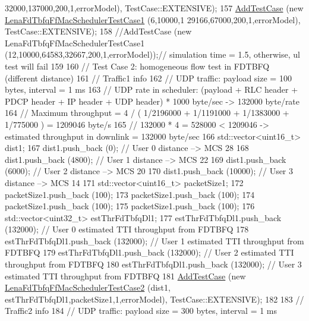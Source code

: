 \begin{DoxyCode}
      32000,137000,200,1,errorModel), TestCase::EXTENSIVE);
157   \hyperlink{classns3_1_1TestCase_a3718088e3eefd5d6454569d2e0ddd835}{AddTestCase} (\textcolor{keyword}{new} \hyperlink{classLenaFdTbfqFfMacSchedulerTestCase1}{LenaFdTbfqFfMacSchedulerTestCase1} (6,10000,1
      29166,67000,200,1,errorModel), TestCase::EXTENSIVE);
158   \textcolor{comment}{//AddTestCase (new LenaFdTbfqFfMacSchedulerTestCase1 (12,10000,64583,32667,200,1,errorModel));//
       simulation time = 1.5, otherwise, ul test will fail}
159 
160   \textcolor{comment}{// Test Case 2: homogeneous flow test in FDTBFQ (different distance)}
161   \textcolor{comment}{// Traffic1 info}
162   \textcolor{comment}{//   UDP traffic: payload size = 100 bytes, interval = 1 ms}
163   \textcolor{comment}{//   UDP rate in scheduler: (payload + RLC header + PDCP header + IP header + UDP header) * 1000 byte/sec
       -> 132000 byte/rate }
164   \textcolor{comment}{// Maximum throughput = 4 / ( 1/2196000 + 1/1191000 + 1/1383000 + 1/775000 ) = 1209046 byte/s}
165   \textcolor{comment}{// 132000 * 4 = 528000 < 1209046 -> estimated throughput in downlink = 132000 byte/sec}
166   std::vector<uint16\_t> dist1;
167   dist1.push\_back (0);       \textcolor{comment}{// User 0 distance --> MCS 28}
168   dist1.push\_back (4800);    \textcolor{comment}{// User 1 distance --> MCS 22}
169   dist1.push\_back (6000);    \textcolor{comment}{// User 2 distance --> MCS 20}
170   dist1.push\_back (10000);   \textcolor{comment}{// User 3 distance --> MCS 14}
171   std::vector<uint16\_t> packetSize1;
172   packetSize1.push\_back (100);
173   packetSize1.push\_back (100);
174   packetSize1.push\_back (100);
175   packetSize1.push\_back (100);
176   std::vector<uint32\_t> estThrFdTbfqDl1;
177   estThrFdTbfqDl1.push\_back (132000); \textcolor{comment}{// User 0 estimated TTI throughput from FDTBFQ}
178   estThrFdTbfqDl1.push\_back (132000); \textcolor{comment}{// User 1 estimated TTI throughput from FDTBFQ}
179   estThrFdTbfqDl1.push\_back (132000); \textcolor{comment}{// User 2 estimated TTI throughput from FDTBFQ}
180   estThrFdTbfqDl1.push\_back (132000); \textcolor{comment}{// User 3 estimated TTI throughput from FDTBFQ}
181   \hyperlink{classns3_1_1TestCase_a3718088e3eefd5d6454569d2e0ddd835}{AddTestCase} (\textcolor{keyword}{new} \hyperlink{classLenaFdTbfqFfMacSchedulerTestCase2}{LenaFdTbfqFfMacSchedulerTestCase2} (dist1,
      estThrFdTbfqDl1,packetSize1,1,errorModel), TestCase::EXTENSIVE);
182 
183   \textcolor{comment}{// Traffic2 info}
184   \textcolor{comment}{//   UDP traffic: payload size = 300 bytes, interval = 1 ms}

\end{DoxyCode}
